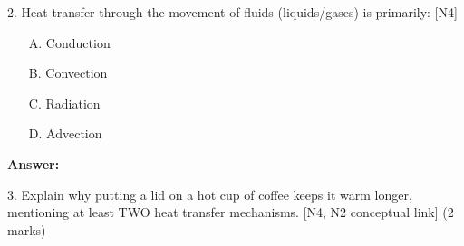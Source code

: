 \documentclass[11pt, a4paper]{article}
\begin{document}
2.  Heat transfer through the movement of fluids (liquids/gases) is primarily: [N4]
    \begin{itemize}
        \item[A.] Conduction
        \item[B.] Convection
        \item[C.] Radiation
        \item[D.] Advection
    \end{itemize}
    \textbf{Answer:} \underline{\hspace{1cm}}

3.  Explain why putting a lid on a hot cup of coffee keeps it warm longer, mentioning at least TWO heat transfer mechanisms. [N4, N2 conceptual link] (2 marks)
    \vspace{3cm}
\end{document}
